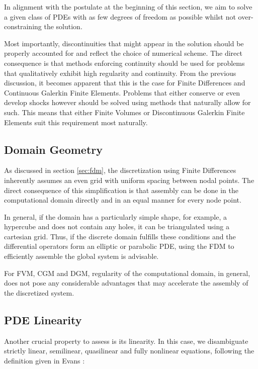 \documentclass[asi,article,submit,moreauthors]{Definitions/mdpi}
\begin{document}
In alignment with the postulate at the beginning of this section, we aim to solve a given class of PDEs with as few degrees of freedom as possible whilst not over-constraining the solution.

Most importantly, discontinuities that might appear in the solution should be properly accounted for and reflect the choice of numerical scheme.
The direct consequence is that methods enforcing continuity should be used for problems that qualitatively exhibit high regularity and continuity.
From the previous discussion, it becomes apparent that this is the case for Finite Differences and Continuous Galerkin Finite Elements.
Problems that either conserve or even develop shocks however should be solved using methods that naturally allow for such.
This means that either Finite Volumes or Discontinuous Galerkin Finite Elements suit this requirement most naturally.

\subsection{Domain Geometry}\label{sec:domain-geometry}

As discussed in section \ref{sec:fdm}, the discretization using Finite Differences inherently assumes an even grid with uniform spacing between nodal points.
The direct consequence of this simplification is that assembly can be done in the computational domain directly and in an equal manner for every node point.

In general, if the domain has a particularly simple shape, for example, a hypercube and does not contain any holes, it can be triangulated using a cartesian grid.
Thus, if the discrete domain fulfills these conditions and the differential operators form an elliptic or parabolic PDE, using the FDM to efficiently assemble the global system is advisable.

For FVM, CGM and DGM, regularity of the computational domain, in general, does not pose any considerable advantages that may accelerate the assembly of the discretized system.

\subsection{PDE Linearity}\label{sec:pde-linearity}

Another crucial property to assess is its linearity.
In this case, we disambiguate strictly linear, semilinear, quasilinear and fully nonlinear equations, following the definition given in Evans \cite{evansPartialDifferentialEquations2010}:
\end{document}
